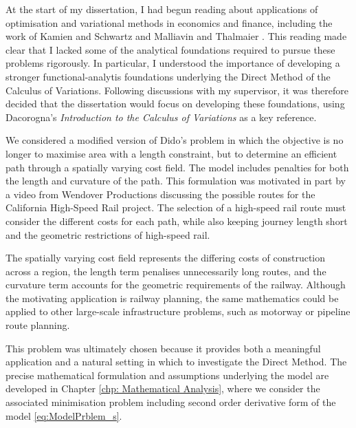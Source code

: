 At the start of my dissertation, I had begun reading about applications of optimisation and variational methods in economics and finance, including the work of Kamien and Schwartz \cite{kamien1981dynamic} and Malliavin and Thalmaier \cite{malliavin2006stochastic}. This reading made clear that I lacked some of the analytical foundations required to pursue these problems rigorously. In particular, I understood the importance of developing a stronger functional-analytis foundations underlying the Direct Method of the Calculus of Variations. Following discussions with my supervisor, it was therefore decided that the dissertation would focus on developing these foundations, using Dacorogna's \textit{Introduction to the Calculus of Variations} \cite{dacorogna} as a key reference.

We considered a modified version of Dido's problem in which the objective is no longer to maximise area with a length constraint, but to determine an efficient path through a spatially varying cost field. The model includes penalties for  both the length and curvature of the path. This formulation was motivated in part by a video from Wendover Productions \cite{wendover2026} discussing the possible routes for the California High-Speed Rail project. The selection of a high-speed rail route must consider the different costs for each path, while also keeping journey length short and the geometric restrictions of high-speed rail.

The spatially varying cost field represents the differing costs of construction across a region, the length term penalises unnecessarily long routes, and the curvature term accounts for the geometric requirements of the railway. Although the motivating application is railway planning, the same mathematics could be applied to other large-scale infrastructure problems, such as motorway or pipeline route planning.

This problem was ultimately chosen because it provides both a meaningful application and a natural setting in which to investigate the Direct Method. The precise mathematical formulation and assumptions underlying the model are developed in Chapter \ref{chp: Mathematical Analysis}, where we consider the associated minimisation problem including second order derivative form of the model \eqref{eq:ModelPrblem_s}.